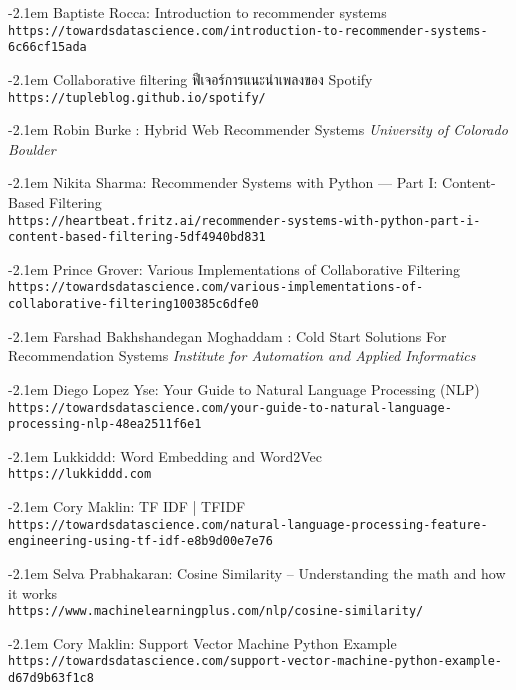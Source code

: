 \documentclass{itkmitlcoop}
\makeatletter
\def\bibindent{2.1em}
\let\old@bibitem\bibitem
\def\bibitem#1{\old@bibitem{#1}\leavevmode\kern-\bibindent}
\makeatother
\begin{document}
\begin{thebibliography}{9}

  Baptiste Rocca: Introduction to recommender systems
  \\\texttt{https://towardsdatascience.com/introduction-to-recommender-systems-6c66cf15ada}

  Collaborative filtering ฟีเจอร์การแนะนำเพลงของ Spotify
  \\\texttt{https://tupleblog.github.io/spotify/}  

  Robin Burke : Hybrid Web Recommender Systems
  \textit{University of Colorado Boulder}

  Nikita Sharma: Recommender Systems with Python — Part I: Content-Based Filtering
  \\\texttt{https://heartbeat.fritz.ai/recommender-systems-with-python-part-i-content-based-filtering-5df4940bd831}

  Prince Grover: Various Implementations of Collaborative Filtering
  \\\texttt{https://towardsdatascience.com/various-implementations-of-collaborative-filtering100385c6dfe0}

  Farshad Bakhshandegan Moghaddam : Cold Start Solutions For Recommendation Systems
  \textit{Institute for Automation and Applied Informatics}

  Diego Lopez Yse: Your Guide to Natural Language Processing (NLP)
  \\\texttt{https://towardsdatascience.com/your-guide-to-natural-language-processing-nlp-48ea2511f6e1}
  
  Lukkiddd: Word Embedding and Word2Vec
  \\\texttt{https://lukkiddd.com}

  Cory Maklin: TF IDF | TFIDF 
  \\\texttt{https://towardsdatascience.com/natural-language-processing-feature-engineering-using-tf-idf-e8b9d00e7e76}
  
  Selva Prabhakaran: Cosine Similarity – Understanding the math and how it works
  \\\texttt{https://www.machinelearningplus.com/nlp/cosine-similarity/}

  Cory Maklin: Support Vector Machine Python Example
  \\\texttt{https://towardsdatascience.com/support-vector-machine-python-example-d67d9b63f1c8}


\end{thebibliography}
\end{document}
